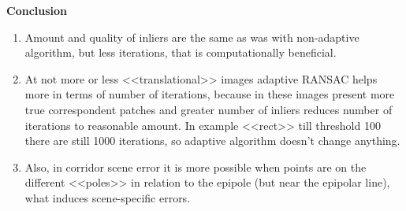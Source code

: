 \documentclass{report}
\begin{document}
\begin{center}
	\textbf{Conclusion}
\end{center}
\begin{enumerate}
	\item Amount and quality of inliers are the same as was with non-adaptive algorithm, but less iterations, that is computationally beneficial.
	
	\item  At not more or less <<translational>> images adaptive RANSAC helps more in terms of number of iterations, because in these images present more true correspondent patches and greater number of inliers reduces number of iterations to reasonable amount. In example <<rect>> till threshold 100 there are still 1000 iterations, so adaptive algorithm doesn't change anything.
	
	\item Also, in corridor scene error it is more possible when points are on the different <<poles>> in relation to the epipole (but near the epipolar line), what induces scene-specific errors. 
\end{enumerate}
\end{document}
